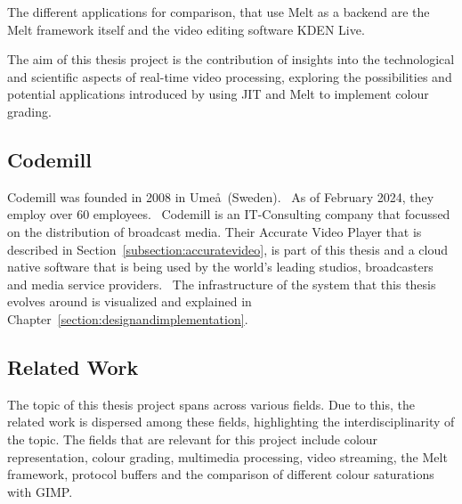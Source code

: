 \documentclass[../MasterThesis.tex]{subfiles}
\begin{document}
	The different applications for comparison, that use Melt as a backend are the Melt framework itself and the video editing software KDEN Live. 
	
	
	The aim of this thesis project is the contribution of insights into the technological and scientific aspects of real-time video processing, exploring the possibilities and potential applications introduced by using JIT and Melt to implement colour grading. 
	
	
	
	
	
	
\newpage	
	\subsection{Codemill} \label{subsection:codemill}
	
	Codemill was founded in 2008 in Ume\aa \ (Sweden).~\cite{codemill_now, codemill_old, codemill_linkedin}
	As of February 2024, they employ over 60 employees.~\cite{codemill} 
	Codemill is an IT-Consulting company that focussed on the distribution of broadcast media. Their Accurate Video Player that is described in Section~\ref{subsection:accuratevideo}, is part of this thesis and a cloud native software that is being used by the world's leading studios, broadcasters and media service providers.~\cite{codemill_linkedin, codemill_avp}
	The infrastructure of the system that this thesis evolves around is visualized and explained in Chapter~\ref{section:designandimplementation}.
	
	
	
	
	
	
	
	
	
	
	
	
	\subsection{Related Work} \label{subsection:relatedwork}
	
	The topic of this thesis project spans across various fields. 
	Due to this, the related work is dispersed among these fields, highlighting the interdisciplinarity of the topic.
	The fields that are relevant for this project include colour representation, colour grading, multimedia processing, video streaming, the Melt framework, protocol buffers and the comparison of different colour saturations with GIMP.
\end{document}
